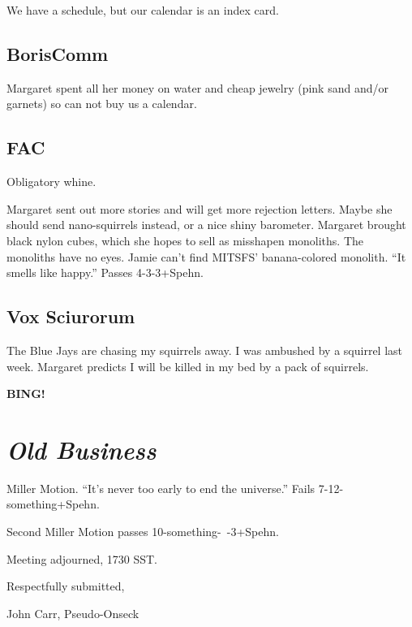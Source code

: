 \documentclass[10pt]{article}
\newcommand{\bing}{{\bf BING!} }
\newcommand{\goto}[1]{\bing \vskip 12pt \section*{{\em{#1}}}}
\begin{document}
We have a schedule, but our calendar is an index card.

\subsection*{BorisComm}

Margaret spent all her money on water and cheap jewelry (pink sand and/or
garnets) so can not buy us a calendar.



\subsection*{FAC}

Obligatory whine.

Margaret sent out more stories and will get more rejection letters.
Maybe she should send nano-squirrels instead, or a nice shiny barometer.
Margaret brought black nylon cubes, which she hopes to sell as misshapen
monoliths.  The monoliths have no eyes.  Jamie can't find MITSFS'
banana-colored monolith.  ``It smells like happy.'' Passes 4-3-3+Spehn.





\subsection*{Vox Sciurorum}

The Blue Jays are chasing my squirrels away.
I was ambushed by a squirrel last week.
Margaret predicts I will be killed in my bed by a pack of squirrels.

\goto{Old Business}

Miller Motion.  ``It's never too early to end the universe.''
Fails 7-12-something+Spehn.

Second Miller Motion passes \hbox{10-something- -3+Spehn}.

%

\vspace{12pt}

\noindent
Meeting adjourned, 1730 SST.

\vspace{18pt}

\centerline{Respectfully submitted,}
\centerline{John Carr, Pseudo-Onseck}
\end{document}
